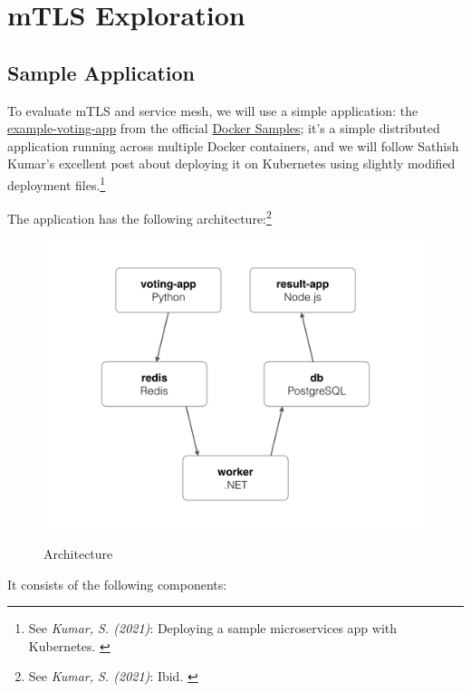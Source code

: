 %
%

\pagebreak
\section{mTLS Exploration}

\onehalfspacing

\subsection{Sample Application}

To evaluate mTLS and service mesh, we will use a simple application: the \href{https://github.com/dockersamples/example-voting-app}{example-voting-app} from the official \href{https://github.com/dockersamples}{Docker Samples}; it's a simple distributed application running across multiple Docker containers, and we will follow Sathish Kumar's excellent post about deploying it on Kubernetes using slightly modified deployment files.\footnote{See \textit{Kumar, S. (2021)}: Deploying a sample microservices app with Kubernetes. \cite{votingApp}}

The application has the following architecture:\footnote{See \textit{Kumar, S. (2021)}: Ibid. \cite{votingApp}}

\begin{figure}[H]
\centering
\caption {Architecture}
\includegraphics[width=\linewidth]{images/architecture.png}
\label{fig:votingApp}
\end{figure}

It consists of the following components:

